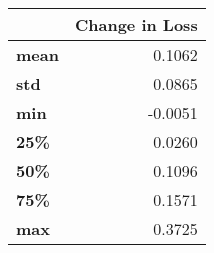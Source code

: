 \begin{tabular}{lr}
\toprule
{} &  Change in Loss \\
\midrule
\textbf{mean} &          0.1062 \\
\textbf{std } &          0.0865 \\
\textbf{min } &         -0.0051 \\
\textbf{25\% } &          0.0260 \\
\textbf{50\% } &          0.1096 \\
\textbf{75\% } &          0.1571 \\
\textbf{max } &          0.3725 \\
\bottomrule
\end{tabular}
